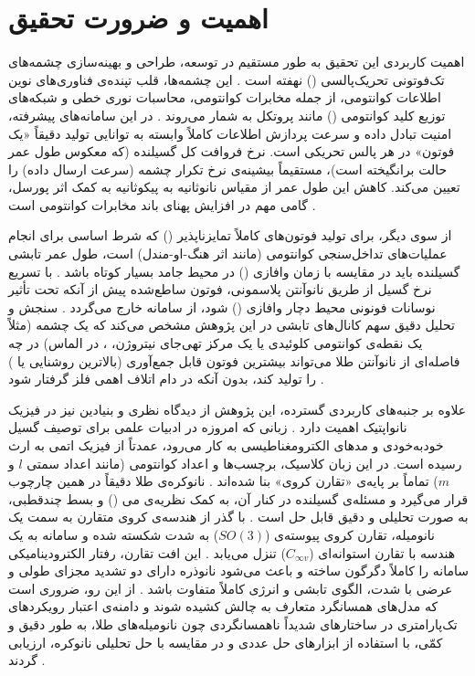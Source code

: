 \documentclass[12pt,a4paper]{report}
\begin{document}
\section{اهمیت و ضرورت تحقیق}
اهمیت کاربردی این تحقیق به طور مستقیم در توسعه، طراحی و بهینه‌سازی چشمه‌های تک‌فوتونی تحریک‌پالسی () نهفته است \cite{novotny,pelton}. این چشمه‌ها، قلب تپنده‌ی فناوری‌های نوین اطلاعات کوانتومی، از جمله مخابرات کوانتومی، محاسبات نوری خطی و شبکه‌های توزیع کلید کوانتومی () مانند پروتکل  به شمار می‌روند \cite{novotny}. در این سامانه‌های پیشرفته، امنیت تبادل داده و سرعت پردازش اطلاعات کاملاً وابسته به توانایی تولید دقیقاً «یک فوتون» در هر پالس تحریکی است. نرخ فروافت کل گسیلنده (که معکوس طول عمر حالت برانگیخته است)، مستقیماً بیشینه‌ی نرخ تکرار چشمه (سرعت ارسال داده) را تعیین می‌کند. کاهش این طول عمر از مقیاس نانوثانیه به پیکوثانیه به کمک اثر پورسل، گامی مهم در افزایش پهنای باند مخابرات کوانتومی است \cite{novotny,maier}.

از سوی دیگر، برای تولید فوتون‌های کاملاً تمایزناپذیر () که شرط اساسی برای انجام عملیات‌های تداخل‌سنجی کوانتومی (مانند اثر هنگ-او-مندل) است، طول عمر تابشی گسیلنده باید در مقایسه با زمان وافازی () در محیط جامد بسیار کوتاه باشد \cite{novotny,pelton}. با تسریع نرخ گسیل از طریق نانوآنتن پلاسمونی، فوتون ساطع‌شده پیش از آنکه تحت تأثیر نوسانات فونونی محیط دچار وافازی () شود، از سامانه خارج می‌گردد \cite{maier,pelton}. سنجش و تحلیل دقیق سهم کانال‌های تابشی در این پژوهش مشخص می‌کند که یک چشمه (مثلاً یک نقطه‌ی کوانتومی کلوئیدی یا یک مرکز تهی‌جای نیتروژن، ، در الماس) در چه فاصله‌ای از نانوآنتن طلا می‌تواند بیشترین فوتون قابل جمع‌آوری (بالاترین روشنایی یا ) را تولید کند، بدون آنکه در دام اتلاف اهمی فلز گرفتار شود \cite{novotny,anger}.

علاوه بر جنبه‌های کاربردی گسترده، این پژوهش از دیدگاه نظری و بنیادین نیز در فیزیک نانواپتیک اهمیت دارد \cite{novotny}. زبانی که امروزه در ادبیات علمی برای توصیف گسیل خودبه‌خودی و مدهای الکترومغناطیسی به کار می‌رود، عمدتاً از فیزیک اتمی به ارث رسیده است. در این زبان کلاسیک، برچسب‌ها و اعداد کوانتومی (مانند اعداد سمتی $l$ و $m$) تماماً بر پایه‌ی «تقارن کروی» بنا شده‌اند \cite{novotny}. نانوکره‌ی طلا دقیقاً در همین چارچوب قرار می‌گیرد و مسئله‌ی گسیلنده در کنار آن، به کمک نظریه‌ی می () و بسط چندقطبی، به صورت تحلیلی و دقیق قابل حل است \cite{mie,ruppin,gersten}. با گذر از هندسه‌ی کروی متقارن به سمت یک نانومیله، تقارن کروی پیوسته‌ی ($SO(3)$) به شدت شکسته شده و سامانه به یک هندسه با تقارن استوانه‌ای ($C_{\infty v}$) تنزل می‌یابد \cite{maier}. این افت تقارن، رفتار الکترودینامیکی سامانه را کاملاً دگرگون ساخته و باعث می‌شود نانوذره دارای دو تشدید مجزای طولی و عرضی با شدت، الگوی تابشی و انرژی کاملاً متفاوت باشد \cite{maier}. از این رو، ضروری است که مدل‌های همسانگرد متعارف به چالش کشیده شوند و دامنه‌ی اعتبار رویکردهای تک‌پارامتری در ساختارهای شدیداً ناهمسانگردی چون نانومیله‌های طلا، به طور دقیق و کمّی، با استفاده از ابزارهای حل عددی و در مقایسه با حل تحلیلی نانوکره، ارزیابی گردند \cite{novotny,koenderink}.
\end{document}
